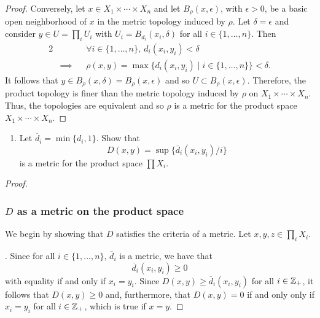 \begin{solution}
\begin{proof}
    Conversely, let $x \in X_1 \times \cdots \times X_n$ and let $B_\rho(x, \epsilon)$, with $\epsilon > 0$, be a basic open neighborhood of $x$ in the metric topology induced by $\rho$.
    Let $\delta = \epsilon$ and consider $y \in U = \prod_i U_i$ with $U_i = B_{d_i}(x_i, \delta)$ for all $i \in \{1, \ldots, n\}$.
    Then
    \begin{alignat*}{2}
      &           && \forall i \in \{1, \ldots, n\},~ d_i(x_i, y_i) < \delta \\
      & \implies  && \rho(x, y) = \max\{ d_i(x_i, y_i) \mid i \in \{1, \ldots, n\} \} < \delta. 
    \end{alignat*}
    It follows that $y \in B_\rho(x, \delta) = B_\rho(x, \epsilon)$ and so $U \subset B_\rho(x, \epsilon)$.
    Therefore, the product topology is finer than the metric topology induced by $\rho$ on $X_1 \times \cdots \times X_n$.
    Thus, the topologies are equivalent and so $\rho$ is a metric for the product space $X_1 \times \cdots \times X_n$.
  \end{proof}
  \bigskip

  \begin{enumerate}[label={(\alph*)}, align=left, leftmargin=\parindent, listparindent=\parindent, labelwidth=0pt, itemindent=!]
    \addtocounter{enumi}{1} 
    \item
      Let $\overline{d}_i = \min\{ d_i, 1 \}$.
      Show that
      \begin{equation*}
        D(x, y) = \sup\{ \overline{d}_i(x_i, y_i) / i \}
      \end{equation*}
      is a metric for the product space $\prod X_i$.
  \end{enumerate}
  \begin{proof}~

    \subsubsection*{$D$ as a metric on the product space}
    We begin by showing that $D$ satisfies the criteria of a metric.
    Let $x, y, z \in \prod_i X_i$.
    \bigskip

    . Since for all $i \in \{1, \ldots, n\}$, $\overline{d}_i$ is a metric, we have that
    \begin{equation*}
      \overline{d}_i(x_i, y_i) \geq 0
    \end{equation*}
    with equality if and only if $x_i = y_i$.
    Since $D(x, y) \geq \overline{d}_i(x_i, y_i)$ for all $i \in \mathbb{Z}_+$, it follows that $D(x, y) \geq 0$ and, furthermore, that $D(x, y) = 0$ if and only only if $x_i = y_i$ for all $i \in \mathbb{Z}_+$, which is true if $x = y$.


\end{proof}
\end{solution}
